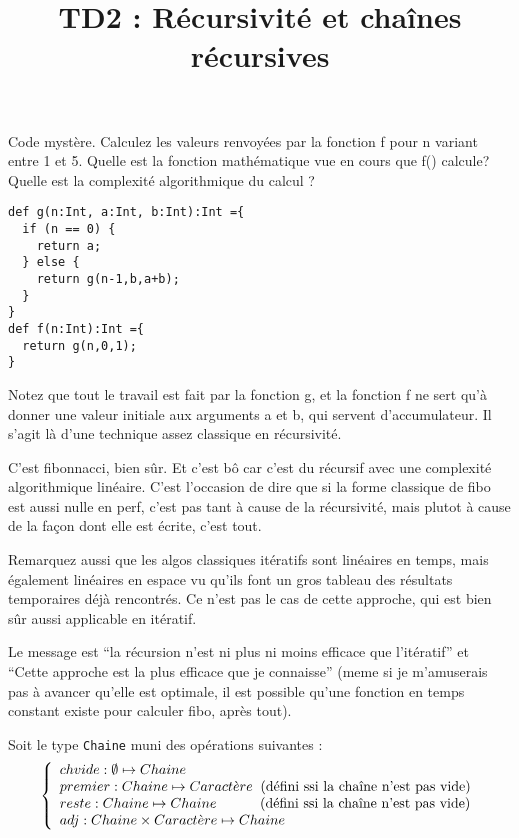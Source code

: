 \documentclass[10pt]{article}\usepackage[correction,nu]{esial}
\title{TD2 : Récursivité et chaînes récursives}
\begin{document}
\maketitle

\noindent\begin{minipage}{.57\linewidth}
\Exercice Code mystère.
\Question Calculez les valeurs renvoyées par la fonction f pour n variant entre
1 et 5. 
\Question Quelle est la fonction mathématique vue en cours que f() calcule?
\Question Quelle est la complexité algorithmique du calcul ? 
\end{minipage}\hfill\begin{minipage}{.4\linewidth}
\begin{Verbatim}
def g(n:Int, a:Int, b:Int):Int ={
  if (n == 0) {
    return a;
  } else {
    return g(n-1,b,a+b);
  }
}
def f(n:Int):Int ={
  return g(n,0,1);
}  
\end{Verbatim}  
\end{minipage}\smallskip

Notez que tout le
travail est fait par la fonction g, et la fonction f ne sert qu'à donner une
valeur initiale aux arguments a et b, qui servent d'accumulateur. Il s'agit là
d'une technique assez classique en récursivité.

\begin{Reponse}
  C'est fibonnacci, bien sûr. Et c'est bô car c'est du récursif avec une
  complexité algorithmique linéaire. C'est l'occasion de dire que si la forme
  classique de fibo est aussi nulle en perf, c'est pas tant à cause de la
  récursivité, mais plutot à cause de la façon dont elle est écrite, c'est
  tout. 

  Remarquez aussi que les algos classiques itératifs sont linéaires en temps,
  mais également linéaires en espace vu qu'ils font un gros tableau des
  résultats temporaires déjà rencontrés. Ce n'est pas le cas de cette approche,
  qui est bien sûr aussi applicable en itératif.

  Le message est ``la récursion n'est ni plus ni moins efficace que
  l'itératif'' et ``Cette approche est la plus efficace que je connaisse''
  (meme si je m'amuserais pas à avancer qu'elle est optimale, il est possible
  qu'une fonction en temps constant existe pour calculer fibo, après tout).
\end{Reponse}

\Exercice Soit le type \texttt{Chaine} muni des opérations suivantes :
$$\left\{
\begin{array}{l}
  chvide:  \emptyset\mapsto Chaine\\
  premier: Chaine\mapsto Caract\grave{e}re \;\;\text{(défini ssi la chaîne 
    n'est pas vide)}\\
  reste:   Chaine\mapsto Chaine \text{\hspace{11mm}(défini ssi la chaîne 
    n'est pas vide)}\\
  adj:     Chaine\times Caract\grave{e}re \mapsto Chaine
\end{array}\right.
$$
\end{document}
